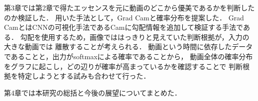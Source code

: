 第3章では第2章で得たエッセンスを元に動画のどこから優美であるかを判断したのか検証した．
用いた手法として，Grad Cam\cite{gradcam}と確率分布を提案した．
Grad CamとはCNNの可視化手法であるCam\cite{cam}に勾配情報を追加して検証する手法である．
勾配を使用するため，画像でははっきりと見えていた判断根拠が，入力の大きな動画では
離散することが考えられる．
動画という時間に依存したデータであることと，出力がsoftmaxによる確率であることから，
動画全体の確率分布をグラフに起こし，どの辺りが確率が高まっているかを確認することで
判断根拠を特定しようとする試みも合わせて行った．

第4章では本研究の総括と今後の展望についてまとめた．